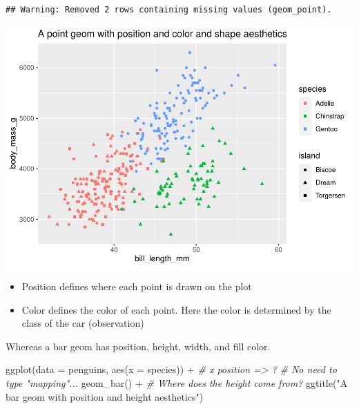 \documentclass[
]{article}
\newenvironment{Shaded}{\begin{snugshade}}{\end{snugshade}}
\newcommand{\AttributeTok}[1]{\textcolor[rgb]{0.77,0.63,0.00}{#1}}
\newcommand{\CommentTok}[1]{\textcolor[rgb]{0.56,0.35,0.01}{\textit{#1}}}
\newcommand{\FunctionTok}[1]{\textcolor[rgb]{0.00,0.00,0.00}{#1}}
\newcommand{\NormalTok}[1]{#1}
\newcommand{\SpecialCharTok}[1]{\textcolor[rgb]{0.00,0.00,0.00}{#1}}
\newcommand{\StringTok}[1]{\textcolor[rgb]{0.31,0.60,0.02}{#1}}
\providecommand{\tightlist}{%
  \setlength{\itemsep}{0pt}\setlength{\parskip}{0pt}}
\begin{document}
\begin{verbatim}
## Warning: Removed 2 rows containing missing values (geom_point).
\end{verbatim}

\includegraphics{Grammar-of-Graphics_files/figure-latex/geom_point_position_colour_shape-1.pdf}

\begin{itemize}
\tightlist
\item
  Position defines where each point is drawn on the plot
\item
  Color defines the color of each point. Here the color is determined by
  the class of the car (observation)
\end{itemize}

Whereas a bar geom has position, height, width, and fill color.

\begin{Shaded}
\begin{Highlighting}[]
\FunctionTok{ggplot}\NormalTok{(}\AttributeTok{data =}\NormalTok{ penguins, }
       \FunctionTok{aes}\NormalTok{(}\AttributeTok{x =}\NormalTok{ species)) }\SpecialCharTok{+} \CommentTok{\# x position =\textgreater{} ?}
  \CommentTok{\# No need to type "mapping"...}
  \FunctionTok{geom\_bar}\NormalTok{() }\SpecialCharTok{+} \CommentTok{\# Where does the height come from?}
  \FunctionTok{ggtitle}\NormalTok{(}\StringTok{"A bar geom with position and height aesthetics"}\NormalTok{)}
\end{Highlighting}
\end{Shaded}
\end{document}
